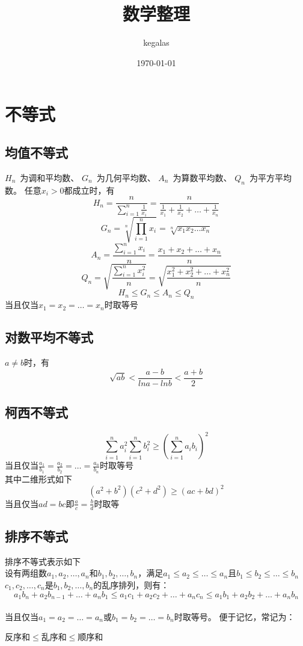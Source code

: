\documentclass[UTF8]{ctexart}
\title{数学整理}
\author{kegalas}
\date{\today}
\begin{document}
	\maketitle
	\tableofcontents
	\newpage
	\section{不等式}
		\subsection{均值不等式}
			$H_n$\  为调和平均数、
			$G_n$\	为几何平均数、
			$A_n$\	为算数平均数、
			$Q_n$\	为平方平均数。
			任意$x_i> 0$都成立时，有
			\[H_n=\frac{n}{\sum\limits_{i=1}^n\frac{1}{x_i}}=\frac{n}{\frac{1}{x_1}+\frac{1}{x_2}+\dots+\frac{1}{x_n}}\] 
			\[G_n=\sqrt[n]{\prod_{i=1}^{n}x_i}=\sqrt[n]{x_1 x_2 \dots x_n}\]
			\[A_n=\frac{\sum\limits_{i=1}^{n}x_i}{n}=\frac{x_1+x_2+\dots+x_n}{n}\]
			\[Q_n=\sqrt{\frac{\sum\limits_{i=1}^{n}x_i^{2}}{n}}=\sqrt{\frac{x_1^{2}+x_2^{2}+\dots+x_n^{2}}{n}}\]
			\[H_n\leq G_n\leq A_n\leq Q_n\]
			当且仅当$x_1=x_2=\dots =x_n$时取等号
		\subsection{对数平均不等式}
			$a\neq b$时，有
			\[\sqrt{ab}<\frac{a-b}{lna-lnb}<\frac{a+b}{2}\]
		\subsection{柯西不等式}
			\[\sum\limits_{i=1}^{n}a_i^{2}\sum\limits_{i=1}^{n}b_i^{2}\geq (\sum\limits_{i=1}^{n}a_i b_i)^2\]
			当且仅当$\frac{a_1}{b_1}=\frac{a_2}{b_2}=\dots =\frac{a_n}{b_n}$时取等号\\
			其中二维形式如下
			\[(a^2+b^2)(c^2+d^2)\geq (ac+bd)^2\]
			当且仅当$ad=bc$即$\frac{a}{c}=\frac{b}{d}$时取等
		\subsection{排序不等式}
			排序不等式表示如下\\
			设有两组数$a_1,a_2,\dots,a_n$和$b_1,b_2,\dots,b_n$，满足$a_1\leq a_2\leq \dots \leq a_n$且$b_1\leq b_2\leq \dots \leq b_n$
			$c_1,c_2,\dots,c_n$是$b_1,b_2,\dots,b_n$的乱序排列，则有：
			\\
			\[a_1 b_n+a_2 b_{n-1}+\dots+a_n b_1\leq a_1 c_1+a_2 c_2+\dots+a_n c_n\leq a_1 b_1+a_2 b_2+\dots+a_n b_n\]
			\\
			当且仅当$a_1=a_2=\dots=a_n$或$b_1=b_2=\dots=b_n$时取等号。
			便于记忆，常记为：
			\begin{center}
				反序和$\leq$乱序和$\leq$顺序和
			\end{center}
\end{document}

